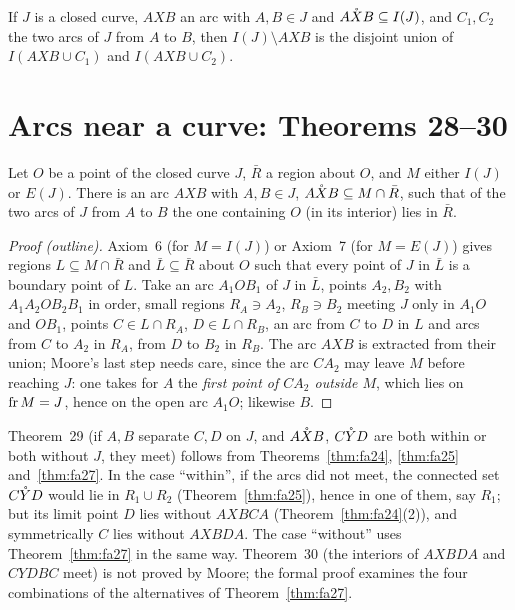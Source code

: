 
\begin{corollary}\label{cor:split-interior}
If $J$ is a closed curve, $AXB$ an arc with $A,B\in J$ and $\mathring{AXB}\subseteq I(J)$, and $C_1,C_2$ the two arcs of $J$
from $A$ to $B$, then $I(J)\setminus AXB$ is the disjoint union of $I(AXB\cup C_1)$ and $I(AXB\cup C_2)$.
\end{corollary}


\section{Arcs near a curve: Theorems 28--30}

\begin{theorem}[F.A.\ Theorem~28]\label{thm:fa28}
Let $O$ be a point of the closed curve $J$, $\bar R$ a region about $O$, and $M$ either $I(J)$ or $E(J)$. There is an
arc $AXB$ with $A,B\in J$, $\mathring{AXB}\subseteq M\cap\bar R$, such that of the two arcs of $J$ from $A$ to $B$ the one
containing $O$ (in its interior) lies in $\bar R$.
\end{theorem}

\begin{proof}[Proof (outline)]
Axiom~6 (for $M=I(J)$) or Axiom~7 (for $M=E(J)$) gives regions $L\subseteq M\cap\bar R$ and $\bar L\subseteq\bar R$ about $O$ such
that every point of $J$ in $\bar L$ is a boundary point of $L$. Take an arc $A_1OB_1$ of $J$ in $\bar L$, points $A_2,B_2$
with $A_1A_2OB_2B_1$ in order, small regions $R_A\ni A_2$, $R_B\ni B_2$ meeting $J$ only in $A_1O$ and $OB_1$, points
$C\in L\cap R_A$, $D\in L\cap R_B$, an arc from $C$ to $D$ in $L$ and arcs from $C$ to $A_2$ in $R_A$, from $D$ to $B_2$ in
$R_B$. The arc $AXB$ is extracted from their union; Moore's last step needs care, since the arc $CA_2$ may leave $M$
before reaching $J$: one takes for $A$ the \emph{first point of $CA_2$ outside $M$}, which lies on $\operatorname{fr} M=J$, hence on the
open arc $A_1O$; likewise $B$.
\end{proof}


Theorem~29 (if $A,B$ separate $C,D$ on $J$, and $\mathring{AXB}$, $\mathring{CYD}$ are both within or both without $J$, they meet)
follows from Theorems~\ref{thm:fa24}, \ref{thm:fa25} and~\ref{thm:fa27}. In the case ``within'', if the arcs did not
meet, the connected set $\mathring{CYD}$ would lie in $R_1\cup R_2$ (Theorem~\ref{thm:fa25}), hence in one of them, say $R_1$; but its
limit point $D$ lies without $AXBCA$ (Theorem~\ref{thm:fa24}(2)), and symmetrically $C$ lies without $AXBDA$. The case ``without'' uses
Theorem~\ref{thm:fa27} in the same way. Theorem~30 (the interiors of $AXBDA$ and $CYDBC$ meet) is not proved by Moore; the formal proof
examines the four combinations of the alternatives of Theorem~\ref{thm:fa27}.

